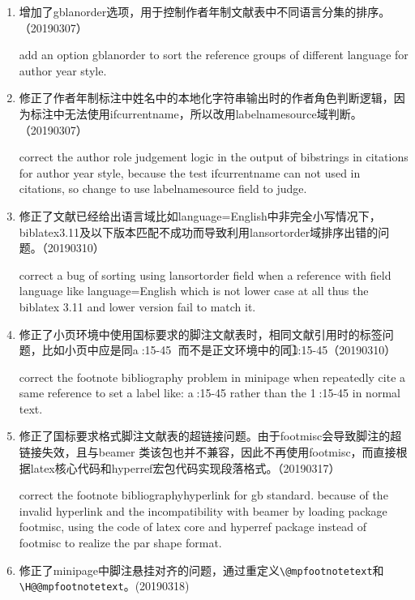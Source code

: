 \label{up:190328}
\begin{enumerate}

\item 增加了gblanorder选项，用于控制作者年制文献表中不同语言分集的排序。（20190307）

add an option gblanorder to sort the reference groups of different language for author year style.

\item 修正了作者年制标注中姓名中的本地化字符串输出时的作者角色判断逻辑，因为标注中无法使用ifcurrentname，所以改用labelnamesource域判断。（20190307）

correct the author role judgement logic in the output of bibstrings in citations for author year style, because the  test ifcurrentname can not used in citations, so change to use labelnamesource field to judge.

\item 修正了文献已经给出语言域比如language={English}中非完全小写情况下，biblatex3.11及以下版本匹配不成功而导致利用lansortorder域排序出错的问题。（20190310）

correct a bug of sorting using lansortorder field when a reference with field language like language={English} which is not lower case at all thus the biblatex 3.11 and lower version fail to match it.


\item 修正了小页环境中使用国标要求的脚注文献表时，相同文献引用时的标签问题，比如小页中应是同\textcircled{\tiny a}:15-45，
而不是正文环境中的同\textcircled{\tiny 1}:15-45（20190310）

correct the footnote bibliography problem in minipage when repeatedly cite a same reference to set a label like: \textcircled{\tiny a}:15-45 rather than the \textcircled{\tiny 1}:15-45 in normal text.

\item 修正了国标要求格式脚注文献表的超链接问题。由于footmisc会导致脚注的超链接失效，且与beamer 类该包也并不兼容，因此不再使用footmisc，而直接根据latex核心代码和hyperref宏包代码实现段落格式。（20190317）

correct the footnote bibliographyhyperlink for gb standard. because of the invalid hyperlink and the incompatibility with beamer by loading package footmisc, using the code of latex core  and hyperref package instead of footmisc to realize the par shape format.

\item 修正了minipage中脚注悬挂对齐的问题，通过重定义\verb|\@mpfootnotetext|和\verb|\H@@mpfootnotetext|。(20190318)


\end{enumerate}

